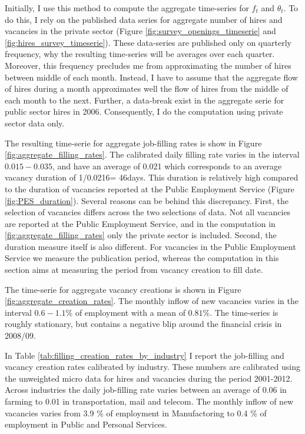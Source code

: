 Initially, I use this method to compute the aggregate time-series for $f_t$ and $\theta_t$.  To do this, I rely on the published data series for aggregate number of hires and vacancies in the private sector (Figure \ref{fig:survey_openings_timeserie} and \ref{fig:hires_survey_timeserie}). These data-series are published only on quarterly frequency, why the resulting time-series will be averages over each quarter. Moreover, this frequency precludes me from approximating the number of hires between middle of each month. Instead, I have to assume that the aggregate flow of hires during a month approximates well the flow of hires from the middle of each month to the next. Further, a data-break exist in the aggregate serie for public sector hires in 2006. Consequently, I do the computation using private sector data only.

The resulting time-serie for aggregate job-filling rates is show in Figure \ref{fig:aggregate_filling_rates}. The calibrated daily filling rate varies in the interval $0.015-0.035 $, and have an average of 0.021 which corresponds to an average vacancy duration of 1/0.0216= 46days. This duration is relatively high compared to the duration of vacancies reported at the Public Employment Service (Figure \ref{fig:PES_duration}). Several reasons can be behind this discrepancy. First, the selection of vacancies differs across the two selections of data. Not all vacancies are reported at the Public Employment Service, and in the computation in \ref{fig:aggregate_filling_rates} only the private sector is included. Second, the duration measure itself is also different. For vacancies in the Public Employment Service we measure the publication period, whereas the computation in this section aims at measuring the period from vacancy creation to fill date. 

The time-serie for aggregate vacancy creations is shown in Figure \ref{fig:aggregate_creation_rates}. The monthly inflow of new vacancies varies in the interval $0.6-1.1 \%$ of employment with a mean of $0.81 \%$. The time-series is roughly stationary, but contains a negative blip around the financial crisis in 2008/09.

In Table \ref{tab:filling_creation_rates_by_industry} I report the job-filling and vacancy creation rates calibrated by industry. These numbers are calibrated using the unweighted micro data for hires and vacancies during the period 2001-2012. Across industries the daily job-filling rate varies between an average of 0.06 in farming  to 0.01 in transportation, mail and telecom. The monthly inflow of new vacancies varies from 3.9 \% of employment in Manufactoring to 0.4 \% of employment in Public and Personal Services. 


